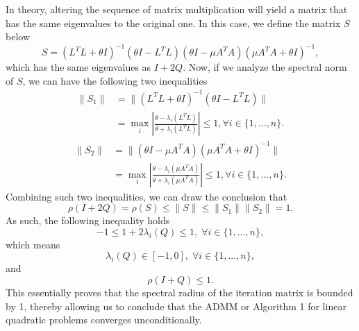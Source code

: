 \documentclass[letterpaper]{article} %
\begin{document}
In theory, altering the sequence of matrix multiplication will yield a matrix that has the same eigenvalues to the original one. In this case, we define the matrix $S$ below
\begin{equation*}
    S =  (L^T L + \theta I)^{-1}( \theta I-L^T L)
   ( \theta I-\mu A^T A)(\mu A^T A + \theta I)^{-1},
\end{equation*}
which has the same eigenvalues as $I+2Q$. Now, if we analyze the spectral norm of $S$, we can have the following two inequalities
\begin{equation*}
\begin{split}
    \|S_1\| & =\| (L^T L + \theta I)^{-1}( \theta I-L^T L)\| \\
            & =\max_i\left|\frac{\theta-\lambda_i (L^T L)}{\theta+\lambda_i (L^T L)}\right| \leq 1, \forall i \in \{1,...,n\}.
\end{split}
\end{equation*}
\begin{equation*}
\begin{split}
		\|S_2\| & = \| ( \theta I-\mu A^T A)(\mu A^T A + \theta I)^{-1} \| \\
                    & = \max_i\left|\frac{\theta-\lambda_i (\mu A^T A)}{\theta+\lambda_i (\mu A^T A)}\right|\leq 1, \forall i \in \{1,...,n\}.
  \end{split}
\end{equation*}
Combining such two inequalities, we can draw the conclusion that
\begin{equation*}
		\rho(I + 2Q)=\rho(S)\leq \|S\|\leq\|S_1\| \|S_2\|=1.
\end{equation*}
As such, the following inequality holds
\begin{equation*}
		-1\leq 1+2\lambda_i(Q)\leq 1, \;\forall i \in \{1,...,n\},
\end{equation*}
which means
\begin{equation*}
		\lambda_i (Q)\in [-1,0], \; \forall i \in \{1,...,n\},
\end{equation*}
and
\begin{equation*}
    \rho(I+Q)\leq 1.
\end{equation*}
This essentially proves that the spectral radius of the iteration matrix is bounded by 1, thereby allowing us to conclude that the ADMM or Algorithm 1 for linear quadratic problems converges unconditionally.
\end{document}
